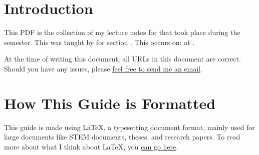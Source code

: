\graphicspath{{./}}     %


\lstset{        %
  basicstyle=\ttfamily,
  frame=single,
  breaklines=true
}
\maketitle              %
\newpage                %
\tableofcontents        %
\newpage                %

\section{Introduction}
This PDF is the collection of my lecture notes for \myCourseCode{} that took place during the \myCourseSemester{} semester. This was taught by \myCourseProf{} for section \myCourseSection{}. This occurs on: \myCourseSchedule{} at \myCourseLocation{}.

At the time of writing this document, all URLs in this document are correct. Should you have any issues, please \underline{\href{mailto:HusseinEsmailContact@gmail.com}{feel free to send me an email}}. 

\section{How This Guide is Formatted}
This guide is made using \LaTeX{}, a typesetting document format, mainly used for large documents like STEM documents, theses, and research papers. To read more about what I think about \LaTeX{}, you \href{https://husseinesmail.xyz/articles/is-latex-better.html}{can go here}.







